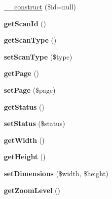 \begin{DoxyCompactItemize}
\item 
\hyperlink{classScan_ab363efba88dd615f165bc1466558b5ed}{\_\-\_\-construct} (\$id=null)
\item 
\hypertarget{classScan_a30ad0e456f9d0f3b3b0ef028e7e36d37}{
{\bfseries getScanId} ()}
\label{classScan_a30ad0e456f9d0f3b3b0ef028e7e36d37}

\item 
\hypertarget{classScan_a42dd7daac88813b9d6f56fe25200b091}{
{\bfseries getScanType} ()}
\label{classScan_a42dd7daac88813b9d6f56fe25200b091}

\item 
\hypertarget{classScan_ad48c38cfecac0d7cc68987eaa94a4fd4}{
{\bfseries setScanType} (\$type)}
\label{classScan_ad48c38cfecac0d7cc68987eaa94a4fd4}

\item 
\hypertarget{classScan_a87a54b3f76ea8d9ebd38fca9e1cb872a}{
{\bfseries getPage} ()}
\label{classScan_a87a54b3f76ea8d9ebd38fca9e1cb872a}

\item 
\hypertarget{classScan_a478d366c5f8260ff0137d6800f548174}{
{\bfseries setPage} (\$page)}
\label{classScan_a478d366c5f8260ff0137d6800f548174}

\item 
\hypertarget{classScan_a8e73646b63b62868d2fdb5d7a786b37e}{
{\bfseries getStatus} ()}
\label{classScan_a8e73646b63b62868d2fdb5d7a786b37e}

\item 
\hypertarget{classScan_a3464fedd4ccf9fb835675d7f2728ca11}{
{\bfseries setStatus} (\$status)}
\label{classScan_a3464fedd4ccf9fb835675d7f2728ca11}

\item 
\hypertarget{classScan_a6da16877d1b4ce7c719df2ac4d60f087}{
{\bfseries getWidth} ()}
\label{classScan_a6da16877d1b4ce7c719df2ac4d60f087}

\item 
\hypertarget{classScan_a4e2e1dc0235c3a60c95afd4cf1335aa9}{
{\bfseries getHeight} ()}
\label{classScan_a4e2e1dc0235c3a60c95afd4cf1335aa9}

\item 
\hypertarget{classScan_a1218a62529873d92b384150adf99f6fc}{
{\bfseries setDimensions} (\$width, \$height)}
\label{classScan_a1218a62529873d92b384150adf99f6fc}

\item 
\hypertarget{classScan_a5d594d9549e5245eb615220d237bd2ff}{
{\bfseries getZoomLevel} ()}
\label{classScan_a5d594d9549e5245eb615220d237bd2ff}


\end{DoxyCompactItemize}
